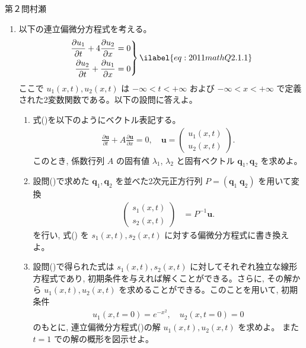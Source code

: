 \begin{question}{第２問}{村瀬}
\begin{enumerate}
\item
  以下の連立偏微分方程式を考える。
  \begin{align}
    \left.\begin{aligned}
      \frac{\partial u_1}{\partial t}
      +4 \frac{\partial u_2}{\partial x} &= 0\\
      \frac{\partial u_2}{\partial t}
      + \frac{\partial u_1}{\partial x} &= 0
    \end{aligned}\right\} \ilabel{eq:2011mathQ2.1.1}
  \end{align}
  ここで $u_1(x, t), u_2(x, t)$ は $-\infty<t<+\infty$ および $-\infty<x<+\infty$
  で定義された2変数関数である。以下の設問に答えよ。

  \begin{enumerate}
  \item{}
    式()を以下のようにベクトル表記する。
    \begin{align*}
      \frac{\partial \bm{u}}{\partial t} + A\frac{\partial \bm{u}}{\partial x}=0,\quad
      \bm{u}=\begin{pmatrix} u_1(x,t) \\ u_2(x,t) \end{pmatrix}.
    \end{align*}
    このとき, 係数行列 $A$ の固有値 $\lambda_1$, $\lambda_2$
    と固有ベクトル $\bm{q}_1, \bm{q}_2$ を求めよ。

  \item{}
    設問()で求めた $\bm{q}_1, \bm{q}_2$ を並べた2次元正方行列 $P=(\bm{q}_1\; \bm{q}_2)$ を用いて変換
    \begin{align*}
      \begin{pmatrix} s_1(x,t) \\ s_2(x,t) \end{pmatrix} &= P^{-1} \bm{u}.
    \end{align*}
    を行い, 式() を $s_1(x, t), s_2(x, t)$ に対する偏微分方程式に書き換えよ。

  \item
    設問()で得られた式は
    $s_1(x, t), s_2(x, t)$ に対してそれぞれ独立な線形方程式であり,
    初期条件を与えれば解くことができる。さらに, その解から $u_1(x, t), u_2(x, t)$
    を求めることができる。このことを用いて, 初期条件
    \begin{align*}
      u_1(x, t=0)=e^{-x^2},\quad
      u_2(x, t=0)=0
    \end{align*}
    のもとに, 連立偏微分方程式()の解 $u_1(x, t), u_2(x, t)$ を求めよ。
    また $t=1$ での解の概形を図示せよ。
  \end{enumerate}


\end{enumerate}
\end{question}
